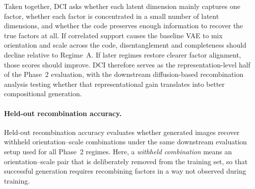 Taken together, DCI asks whether each latent dimension mainly captures one factor, whether each factor is concentrated in a small number of latent dimensions, and whether the code preserves enough information to recover the true factors at all. If correlated support causes the baseline VAE to mix orientation and scale across the code, disentanglement and completeness should decline relative to Regime~A. If later regimes restore clearer factor alignment, those scores should improve. DCI therefore serves as the representation-level half of the Phase~2 evaluation, with the downstream diffusion-based recombination analysis testing whether that representational gain translates into better compositional generation.

\paragraph{Held-out recombination accuracy.}
Held-out recombination accuracy evaluates whether generated images recover withheld orientation--scale combinations under the same downstream evaluation setup used for all Phase~2 regimes. Here, a \emph{withheld combination} means an orientation--scale pair that is deliberately removed from the training set, so that successful generation requires recombining factors in a way not observed during training.

